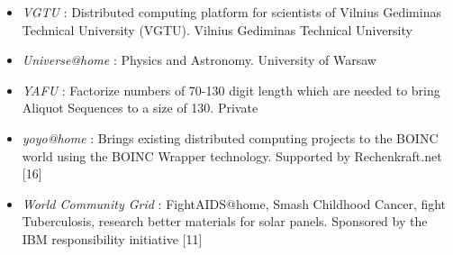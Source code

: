 \begin{itemize}
	\item {\em VGTU} : Distributed computing platform for scientists of Vilnius Gediminas Technical University (VGTU).	Vilnius Gediminas Technical University
	\item {\em Universe@home} : Physics and Astronomy. University of Warsaw
	\item {\em YAFU} : Factorize numbers of 70-130 digit length which are needed to bring Aliquot Sequences to a size of 130.	Private	
	\item {\em yoyo@home} : Brings existing distributed computing projects to the BOINC world using the BOINC Wrapper technology. Supported by Rechenkraft.net [16]
	\item {\em World Community Grid} : FightAIDS@home, Smash Childhood Cancer, fight Tuberculosis, research better materials for solar panels.	Sponsored by the IBM responsibility initiative [11]
	
\end{itemize}
		

